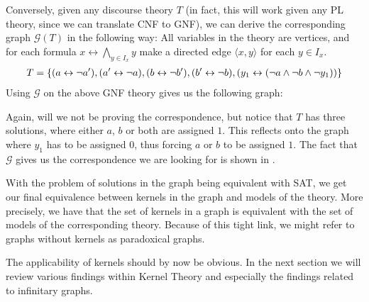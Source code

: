 Conversely, given any discourse theory $T$ (in fact, this will work given any PL theory, since we can translate CNF to GNF), we can derive the corresponding graph $\mathcal{G}(T)$ in the following way:
All variables in the theory are vertices, and for each formula $x \leftrightarrow \bigwedge_{y \in I_x} y$ make a directed edge $\langle x,y \rangle$ for each $y \in I_x$.
  \begin{align}
    T = \{ ( a \leftrightarrow \neg a'), (a' \leftrightarrow \neg a), (b \leftrightarrow \neg b'), (b' \leftrightarrow \neg b), (y_1 \leftrightarrow (\neg a \wedge \neg b \wedge \neg y_1)) \}
  \end{align}
  Using $\mathcal{G}$ on the above GNF theory gives us the following graph:\par
  \begin{figure}[!h]
    \centering
    \caption{}
    \label{ex:graph_from_theory}
\end{figure}
Again, will we not be proving the correspondence, but notice that $T$ has three solutions, where either $a$, $b$ or both are assigned $1$.
This reflects onto the graph where $y_1$ has to be assigned $0$, thus forcing $a$ or $b$ to be assigned $1$.
The fact that $\mathcal{G}$ gives us the correspondence we are looking for is shown in \cite{apal-digraph}.

With the problem of solutions in the graph being equivalent with SAT, we get our final equivalence between kernels in the graph and models of the theory.
More precisely, we have that the set of kernels in a graph is equivalent with the set of models of the corresponding theory.
Because of this tight link, we might refer to graphs without kernels as paradoxical graphs.

The applicability of kernels should by now be obvious.
In the next section we will review various findings within Kernel Theory and especially the findings related to infinitary graphs.
